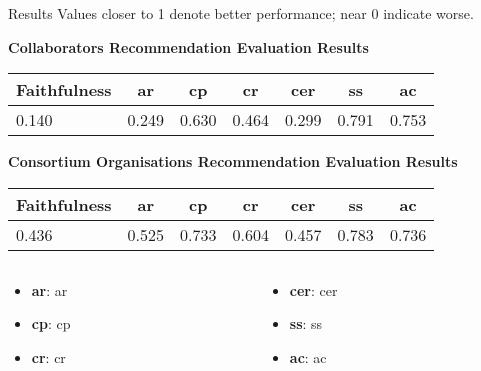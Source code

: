 \begin{tframe}{Results}
Values closer to 1 denote better performance; near 0 indicate worse.

\begin{center}
    \textbf{Collaborators Recommendation Evaluation Results}
    \begin{table}
        \centering
        \begin{tabularx}{\textwidth}{|X|c|c|c|c|c|c|}
          \hline
          \textbf{Faithfulness} & \textbf{\gls{ar}} & \textbf{\gls{cp}} & \textbf{\gls{cr}} & \textbf{\gls{cer}} & \textbf{\gls{ss}} & \textbf{\gls{ac}} \\
        \hline
        0.140 & 0.249 & 0.630 & 0.464 & 0.299 & 0.791 & 0.753 \\
        \hline
    \end{tabularx}
    \end{table}
\end{center}
\vspace{.2cm}
\begin{center}
    \textbf{Consortium Organisations Recommendation Evaluation Results}
    \begin{table}
        \centering
        \begin{tabularx}{\textwidth}{|X|c|c|c|c|c|c|}
        \hline
        \textbf{Faithfulness} & \textbf{\gls{ar}} & \textbf{\gls{cp}} & \textbf{\gls{cr}} & \textbf{\gls{cer}} & \textbf{\gls{ss}} & \textbf{\gls{ac}} \\
        \hline
        0.436 & 0.525 & 0.733 & 0.604 & 0.457 & 0.783 & 0.736 \\
        \hline
    \end{tabularx}
    \end{table}
\end{center}

{
    \scriptsize
    \begin{columns}
        \begin{column}{0.48\textwidth}
    \begin{itemize}
        \item \textbf{\gls{ar}}: \acrlong{ar}
        \item \textbf{\gls{cp}}: \acrlong{cp}
        \item \textbf{\gls{cr}}: \acrlong{cr}
    \end{itemize}
\end{column}
\begin{column}{0.48\textwidth}
  \begin{itemize}
    \item \textbf{\gls{cer}}: \acrlong{cer}
        \item \textbf{\gls{ss}}: \acrlong{ss}
        \item \textbf{\gls{ac}}: \acrlong{ac}
    \end{itemize}
\end{column}
\end{columns}
}

\end{tframe}